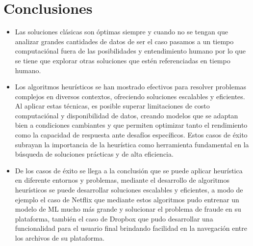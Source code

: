 \documentclass[9pt,a4paper,twoside]{rho-class/rho}
\begin{document}
    \section{Conclusiones}
        \begin{itemize}
            \item Las soluciones clásicas son óptimas siempre y cuando no se tengan que analizar grandes cantidades de datos de ser el caso pasamos a un tiempo computaciónal fuera de las posibilidades y entendimiento humano por lo que se tiene que explorar otras soluciones que estén referenciadas en tiempo humano.
            \item Los algoritmos heurísticos se han mostrado efectivos para resolver problemas complejos en diversos contextos, ofreciendo soluciones escalables y eficientes. Al aplicar estas técnicas, es posible superar limitaciones de costo computaciónal y disponibilidad de datos, creando modelos que se adaptan bien a condiciones cambiantes y que permiten optimizar tanto el rendimiento como la capacidad de respuesta ante desafíos específicos. Estos casos de éxito subrayan la importancia de la heurística como herramienta fundamental en la búsqueda de soluciones prácticas y de alta eficiencia.
            \item De los casos de éxito se llega a la conclusión que se puede aplicar heurística en diferente entornos y problemas, mediante el desarrollo de algoritmos heurísticos se puede desarrollar soluciones escalables y eficientes, a modo de ejemplo el caso de Netflix que mediante estos algoritmos pudo entrenar un modelo de ML mucho más grande y solucionar el problema de fraude en su plataforma, también el caso de Dropbox que pudo desarrollar una funcionalidad para el usuario final brindando facilidad en la navegación entre los archivos de su plataforma.
        \end{itemize}
    \renewcommand{\contentsname}{Tabla de Contenidos}
    \tableofcontents
    \linenumbers

\printbibliography

\end{document}
